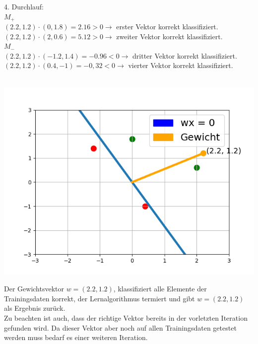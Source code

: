 \documentclass[fontsize=11pt]{scrartcl}
\newenvironment{Figure}
  {\par\medskip\noindent\minipage{\linewidth}}
  {\endminipage\par\medskip}
\begin{document}
                        4. Durchlauf:\\
                        $M_+$\\
                        $(2.2,1.2)\cdot (0,1.8) = 2.16 > 0 \rightarrow$ erster Vektor korrekt klassifiziert.\\
                        $(2.2,1.2)\cdot (2,0.6) = 5.12 > 0 \rightarrow$ zweiter Vektor korrekt klassifiziert.\\
                        $M_-$\\
                        $(2.2,1.2)\cdot (-1.2,1.4) = -0.96 < 0 \rightarrow$ dritter Vektor korrekt klassifiziert.\\
                        $(2.2,1.2)\cdot (0.4,-1) = -0,32 < 0 \rightarrow$ vierter Vektor korrekt klassifiziert.\\
                        \\
                        \begin{Figure}
                            \centering
                            \includegraphics[scale=0.5]{bsp4.png}
                        \end{Figure}
                        Der Gewichtsvektor $w = (2.2,1.2)$, klassifiziert alle Elemente der Trainingsdaten korrekt, der Lernalgorithmus termiert und gibt $w = (2.2,1.2)$ als Ergebnis zurück.\\
                        Zu beachten ist auch, dass der richtige Vektor bereits in der vorletzten Iteration gefunden wird. Da dieser Vektor aber noch auf allen Trainingsdaten getestet werden muss bedarf es einer weiteren Iteration.
\end{document}
